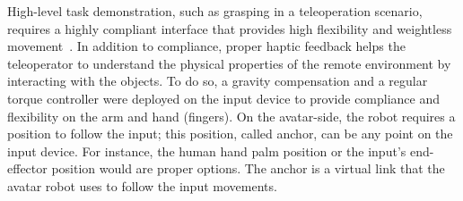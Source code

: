 \documentclass[letterpaper, 10 pt, conference]{ieeeconf}  %
\begin{document}
\noindent
High-level task demonstration, such as grasping in a teleoperation scenario, requires a highly compliant interface that provides high flexibility and weightless movement~\cite{aaron_adaptive_grasping}. In addition to compliance, proper haptic feedback helps the teleoperator to understand the physical properties of the remote environment by interacting with the objects. To do so, a gravity compensation and a regular torque controller were deployed on the input device to provide compliance and flexibility on the arm and hand (fingers).
On the avatar-side, the robot requires a position to follow the input; this position, called anchor, can be any point on the input device. For instance, the human hand palm position or the input's end-effector position would are proper options. The anchor is a virtual link that the avatar robot uses to follow the input movements.


        
   
\end{document}
